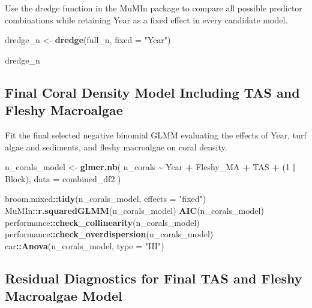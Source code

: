 \documentclass[
]{article}
\newenvironment{Shaded}{\begin{snugshade}}{\end{snugshade}}
\newcommand{\AttributeTok}[1]{\textcolor[rgb]{0.13,0.29,0.53}{#1}}
\newcommand{\DecValTok}[1]{\textcolor[rgb]{0.00,0.00,0.81}{#1}}
\newcommand{\FunctionTok}[1]{\textcolor[rgb]{0.13,0.29,0.53}{\textbf{#1}}}
\newcommand{\NormalTok}[1]{#1}
\newcommand{\OtherTok}[1]{\textcolor[rgb]{0.56,0.35,0.01}{#1}}
\newcommand{\SpecialCharTok}[1]{\textcolor[rgb]{0.81,0.36,0.00}{\textbf{#1}}}
\newcommand{\StringTok}[1]{\textcolor[rgb]{0.31,0.60,0.02}{#1}}
\begin{document}
Use the dredge function in the MuMIn package to compare all possible
predictor combinations while retaining Year as a fixed effect in every
candidate model.

\begin{Shaded}
\begin{Highlighting}[]
\NormalTok{dredge\_n }\OtherTok{\textless{}{-}} \FunctionTok{dredge}\NormalTok{(full\_n, }\AttributeTok{fixed =} \StringTok{"Year"}\NormalTok{)}

\NormalTok{dredge\_n}
\end{Highlighting}
\end{Shaded}

\subsection{Final Coral Density Model Including TAS and Fleshy
Macroalgae}\label{final-coral-density-model-including-tas-and-fleshy-macroalgae}

Fit the final selected negative binomial GLMM evaluating the effects of
Year, turf algae and sediments, and fleshy macroalgae on coral density.

\begin{Shaded}
\begin{Highlighting}[]
\NormalTok{n\_corals\_model }\OtherTok{\textless{}{-}} \FunctionTok{glmer.nb}\NormalTok{(}
\NormalTok{  n\_corals }\SpecialCharTok{\textasciitilde{}}
\NormalTok{    Year }\SpecialCharTok{+}
\NormalTok{    Fleshy\_MA }\SpecialCharTok{+}
\NormalTok{    TAS }\SpecialCharTok{+}
\NormalTok{    (}\DecValTok{1} \SpecialCharTok{|}\NormalTok{ Block),}
  \AttributeTok{data =}\NormalTok{ combined\_df2}
\NormalTok{)}

\NormalTok{broom.mixed}\SpecialCharTok{::}\FunctionTok{tidy}\NormalTok{(n\_corals\_model, }\AttributeTok{effects =} \StringTok{"fixed"}\NormalTok{)}
\NormalTok{MuMIn}\SpecialCharTok{::}\FunctionTok{r.squaredGLMM}\NormalTok{(n\_corals\_model)}
\FunctionTok{AIC}\NormalTok{(n\_corals\_model)}
\NormalTok{performance}\SpecialCharTok{::}\FunctionTok{check\_collinearity}\NormalTok{(n\_corals\_model)}
\NormalTok{performance}\SpecialCharTok{::}\FunctionTok{check\_overdispersion}\NormalTok{(n\_corals\_model)}
\NormalTok{car}\SpecialCharTok{::}\FunctionTok{Anova}\NormalTok{(n\_corals\_model, }\AttributeTok{type =} \StringTok{"III"}\NormalTok{)}
\end{Highlighting}
\end{Shaded}

\subsection{Residual Diagnostics for Final TAS and Fleshy Macroalgae
Model}\label{residual-diagnostics-for-final-tas-and-fleshy-macroalgae-model}
\end{document}
